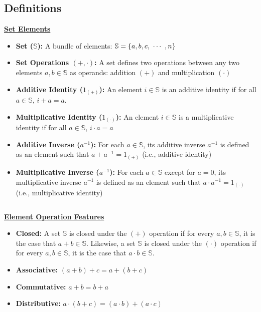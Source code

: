 
\subsection{Definitions}
\label{subsec:group-def}


\begin{tcolorbox}[title={\textbf{\tboxdef{\ref*{subsec:group-def}} Group}}]
\noindent \textbf{\underline{Set Elements}}
\begin{itemize}
\item \textbf{Set ($\mathbb{S}$):} A bundle of elements: $\mathbb{S} = \{a, b, c, \text{ } \text{$\cdots$} \text{ }, n\}$
\item \textbf{Set Operations $\bm{(+, \cdot)}$:} A set defines two operations between any two elements $a, b \in \mathbb{S}$ as operands: addition $(+)$ and multiplication $(\cdot)$
\item \textbf{Additive Identity ($1_{(+)}$):} An element $i \in \mathbb{S}$ is an additive identity if for all $a \in \mathbb{S}$, $i + a = a$.
\item \textbf{Multiplicative Identity ($1_{(\cdot)}$):} An element $i \in \mathbb{S}$ is a multiplicative identity if for all $a \in \mathbb{S}$, $i \cdot a = a$
\item \textbf{Additive Inverse ($a^{-1}$):} For each $a \in \mathbb{S}$, its additive inverse $a^{-1}$ is defined as an element such that $a + a^{-1} = 1_{(+)}$ (i.e., additive identity)
\item \textbf{Multiplicative Inverse ($a^{-1}$):} For each $a \in \mathbb{S}$ except for $a = 0$, its multiplicative inverse $a^{-1}$ is defined as an element such that $a \cdot a^{-1} = 1_{(\cdot)}$ (i.e., multiplicative identity)
\end{itemize}

$ $

\noindent \textbf{\underline{Element Operation Features}}
\begin{itemize}
\item \textbf{Closed:} A set $\mathbb{S}$ is closed under the $(+)$ operation if for every $a, b \in \mathbb{S}$, it is the case that $a + b \in \mathbb{S}$. Likewise, a set $\mathbb{S}$ is closed under the $(\cdot)$ operation if for every $a, b \in \mathbb{S}$, it is the case that $a \cdot b \in \mathbb{S}$. 
\item \textbf{Associative:} $(a + b) + c = a + (b + c)$
\item \textbf{Commutative:} $a + b = b + a$
\item \textbf{Distributive:} $a \cdot (b + c) = (a \cdot b) + (a \cdot c)$
\end{itemize}



\end{tcolorbox}
